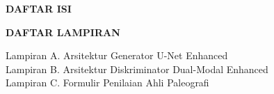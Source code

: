 \documentclass[12pt,a4paper]{article}
\begin{document}
\newpage
{}


\newpage
{}



\newpage{}%



\newpage
\vspace{2cm}
\begin{center}
      {\fontsize{14}{16.8}\selectfont\textbf{DAFTAR ISI}}\\[1em]
\end{center}
\vspace{1em}

{\singlespacing
      \makeatletter
      \makeatother
}

\newpage
{}
\vspace{2cm}
\begin{center}
      {\fontsize{14}{16.8}\selectfont\textbf{DAFTAR LAMPIRAN}}\\[1em]
\end{center}
\vspace{1em}

{\singlespacing
      Lampiran A. Arsitektur Generator U-Net Enhanced \dotfill \pageref{lampiran:A}\\
      Lampiran B. Arsitektur Diskriminator Dual-Modal Enhanced \dotfill \pageref{lampiran:B}\\
      Lampiran C. Formulir Penilaian Ahli Paleografi \dotfill \pageref{lampiran:C}
}
\end{document}
